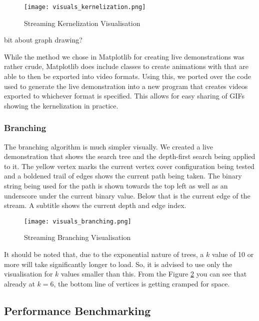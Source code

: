 \begin{figure}[htb]
    \centering
    \texttt{[image: visuals\_kernelization.png]}
    \caption{Streaming Kernelization Visualisation}
    \label{fig:kernelization_visualisation}
\end{figure}

bit about graph drawing?

While the method we chose in Matplotlib for creating live demonstrations was
rather crude, Matplotlib does include classes to create animations with that
are able to then be exported into video formats. Using this, we ported over the
code used to generate the live demonstration into a new program that creates
videos exported to whichever format is specified. This allows for easy sharing
of GIFs showing the kernelization in practice.

\subsubsection{Branching}

The branching algorithm is much simpler visually. We created a live
demonstration that shows the search tree and the depth-first search being
applied to it. The yellow vertex marks the current vertex cover configuration
being tested and a boldened trail of edges shows the current path being taken.
The binary string being used for the path is shown towards the top left as well
as an underscore under the current binary value. Below that is the current edge
of the stream. A subtitle shows the current depth and edge index.

\begin{figure}[htb]
    \centering
    \texttt{[image: visuals\_branching.png]}
    \caption{Streaming Branching Visualisation}
    \label{fig:branching_visualisation}
\end{figure}

It should be noted that, due to the exponential nature of trees, a \(k\) value
of 10 or more will take significantly longer to load. So, it is advised to use
only the visualisation for \(k\) values smaller than this. From the Figure
\ref{fig:branching_visualisation} you can see that already at \(k=6\), the
bottom line of vertices is getting cramped for space.

\subsection{Performance Benchmarking}

